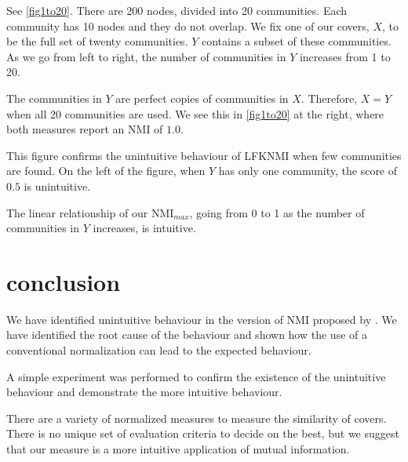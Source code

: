 \documentclass[9pt,technote]{IEEEtran}
\begin{document}
See \cref{fig1to20}. There are 200 nodes, divided into 20 communities. Each community has 10 nodes and they do not overlap.
We fix one of our covers, $X$, to be the full set of twenty communities. $Y$ contains a subset of these communities.
As we go from left to right, the number of communities in $Y$ increases from 1 to 20.

The communities in $Y$ are perfect copies of communities in $X$. Therefore, $X=Y$ when all 20 communities are used.
We see this in \cref{fig1to20} at the right, where both measures report an NMI of $1.0$.

This figure confirms the unintuitive behaviour of LFKNMI when few communities are found.
On the left of the figure, when $Y$ has only one community, the score of $0.5$ is unintuitive.

The linear relationship of our NMI$_{max}$, going from 0 to 1 as the number of communities in $Y$ increases, is intuitive.

\section{conclusion}

We have identified unintuitive behaviour in the version of NMI proposed by \lfk . We have identified the root
cause of the behaviour and shown how the use of a conventional normalization can lead to the expected behaviour.

A simple experiment was performed to confirm the existence of the unintuitive behaviour and demonstrate
the more intuitive behaviour.

There are a variety of normalized measures to measure the similarity of covers.
There is no unique set of evaluation criteria to decide on the best, but we suggest that our measure
is a more intuitive application of mutual information.








%

%

\end{document}
